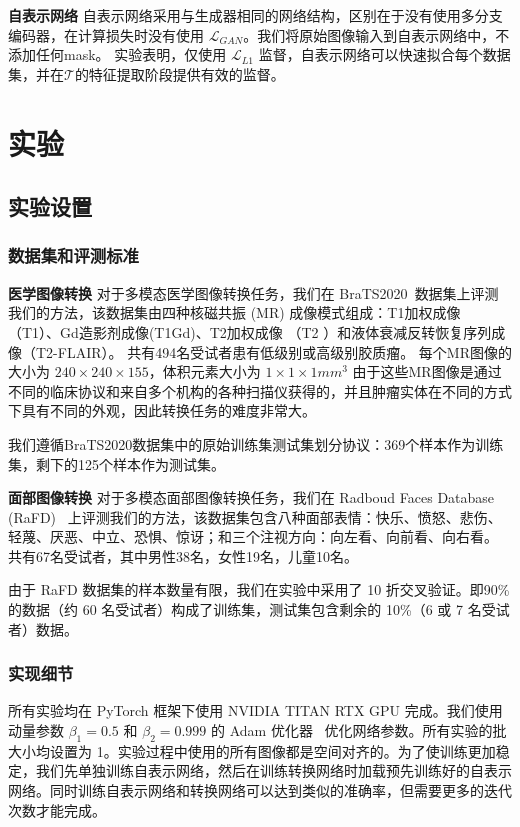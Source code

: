 \textbf{自表示网络} 自表示网络采用与生成器相同的网络结构，区别在于没有使用多分支编码器，在计算损失时没有使用 $\mathcal{L}_{GAN}$。我们将原始图像输入到自表示网络中，不添加任何mask。 实验表明，仅使用 $\mathcal{L}_{L1}$ 监督，自表示网络可以快速拟合每个数据集，并在$\mathcal{T}$的特征提取阶段提供有效的监督。


\section{实验}

\subsection{实验设置}

\subsubsection{数据集和评测标准}

\textbf{医学图像转换}
对于多模态医学图像转换任务，我们在 BraTS2020~\cite{bakas2018identifying}数据集上评测我们的方法，该数据集由四种核磁共振 (MR) 成像模式组成：T1加权成像（T1）、Gd造影剂成像(T1Gd)、T2加权成像 （T2 ）和液体衰减反转恢复序列成像（T2-FLAIR）。 共有494名受试者患有低级别或高级别胶质瘤。 每个MR图像的大小为 $240\times240\times155$，体积元素大小为 $1\times 1\times 1 mm^3$ 由于这些MR图像是通过不同的临床协议和来自多个机构的各种扫描仪获得的，并且肿瘤实体在不同的方式下具有不同的外观，因此转换任务的难度非常大。

我们遵循BraTS2020数据集中的原始训练集测试集划分协议：369个样本作为训练集，剩下的125个样本作为测试集。

\textbf{面部图像转换}
对于多模态面部图像转换任务，我们在 Radboud Faces Database (RaFD)~\cite{langner2010presentation} 上评测我们的方法，该数据集包含八种面部表情：快乐、愤怒、悲伤、轻蔑、厌恶、中立、恐惧、惊讶；和三个注视方向：向左看、向前看、向右看。 共有67名受试者，其中男性38名，女性19名，儿童10名。

由于 RaFD 数据集的样本数量有限，我们在实验中采用了 10 折交叉验证。即90\%的数据（约 60 名受试者）构成了训练集，测试集包含剩余的 10\%（6 或 7 名受试者）数据。

\subsubsection{实现细节}
所有实验均在 PyTorch 框架下使用 NVIDIA TITAN RTX GPU 完成。我们使用动量参数 $\beta_1 = 0.5$ 和 $\beta_2 = 0.999$ 的 Adam 优化器~\cite{kingma2014adam} 优化网络参数。所有实验的批大小均设置为 1。实验过程中使用的所有图像都是空间对齐的。为了使训练更加稳定，我们先单独训练自表示网络，然后在训练转换网络时加载预先训练好的自表示网络。同时训练自表示网络和转换网络可以达到类似的准确率，但需要更多的迭代次数才能完成。

